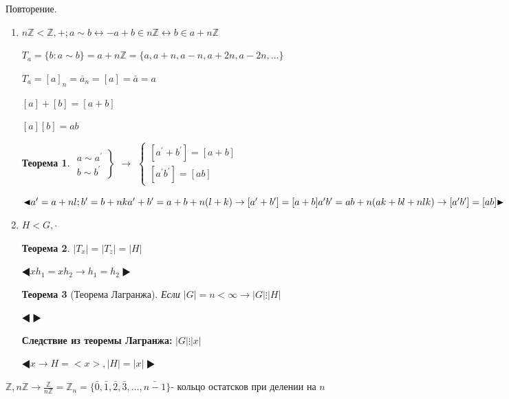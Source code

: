 \documentclass[12pt]{article}
\begin{document}
	\newtheorem{Th}{Теорема}
	\newtheorem{Def}{Определение}

Повторение.

\begin{enumerate}
	\item $n\mathds{Z}<\mathds{Z},+ ; a\sim b\leftrightarrow -a+b\in n\mathds{Z}\leftrightarrow b\in a+n\mathds{Z}$
	
	$T_a=\{b:a\sim b\}=a+n\mathds{Z}=\{a,a+n,a-n,a+2n,a-2n, \dots \}$
	
	$T_a=[a]_n=\bar{a}_n=[a]=\bar{a}=a$
	
	$[a]+[b]=[a+b]$
	
	$[a][b]={ab}$
	
	\begin{Th} 
	$	\left
			.\begin{aligned}
				a\sim a^\prime \\
				b\sim b^\prime
			\end{aligned}
		 \right \} $
		$\rightarrow$
		$\begin{cases}
		[a^\prime +b^\prime]=[a+b] \\
		[a^\prime b^\prime]=[ab]
		\end{cases}$
	\end{Th}
	$\LHD a^\prime =a+nl; b^\prime=b+nk \\
	a^\prime+b^\prime=a+b+n(l+k)\rightarrow [a^\prime+b^\prime]=[a+b] \\
	a^\prime b^\prime=ab+n(ak+bl+nlk)\rightarrow [a^\prime b^\prime]=[ab]
	\RHD$
	
	\item $H<G,\cdot$
	
	\begin{Th} 
		$|T_x|=|T_z|=|H|$
	\end{Th}
	
	$\LHD xh_1=xh_2 \rightarrow h_1=h_2 \RHD$
	
	\begin{Th}[Теорема Лагранжа] 
		Если $|G|=n<\infty \rightarrow |G|\vdots |H|$ 
	\end{Th}
	$\LHD \RHD$
	
	\textbf{Следствие из теоремы Лагранжа:} $|G|\vdots |x|$
	
	$\LHD x\rightarrow H=<x>, |H|=|x|
	\RHD$
	
\end{enumerate}

$\mathds{Z},n\mathds{Z}\rightarrow \frac{\mathds{Z}}{n\mathds{Z}}=\mathds{Z}_n=\{\bar{0},\bar{1},\bar{2},\bar{3}, \dots , \bar{n-1}\}$- кольцо остатсков при делении на $n$
\end{document}
